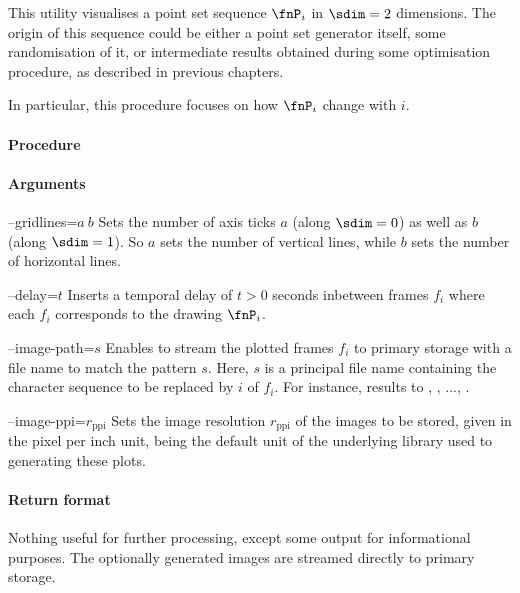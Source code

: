 %
This utility visualises a point set sequence $\fnP_i$ in $\sdim=2$ dimensions. The origin of this sequence could be either a point set generator itself, some randomisation of it, or intermediate results obtained during some optimisation procedure, as described in previous chapters.

In particular, this procedure focuses on how $\fnP_i$ change with $i$.

\paragraph{Procedure}

\begin{synopsis}
\end{synopsis}

\paragraph{Arguments}

\procarginseq{\ptseqsize}

\begin{procarg}{--gridlines=$a\ b$}
  Sets the number of axis ticks $a$ (along $\sdim=0$) as well as $b$ (along $\sdim=1$). So $a$ sets the number of vertical lines, while $b$ sets the number of horizontal lines.
\end{procarg}

\begin{procarg}{--delay=$t$}
  Inserts a temporal delay of $t > 0$ seconds inbetween frames $f_i$ where each $f_i$ corresponds to the drawing $\fnP_i$.
\end{procarg}

\begin{procarg}{--image-path=$s$}
  Enables to stream the plotted frames $f_i$ to primary storage with a file name to match the pattern $s$. Here, $s$ is a principal file name containing the character sequence  to be replaced by $i$ of $f_i$. For instance,  results to , , ..., .
\end{procarg}

\begin{procarg}{--image-ppi=$r_{\text{ppi}}$}
  Sets the image resolution $r_{\text{ppi}}$ of the images to be stored, given in the pixel per inch unit, being the default unit of the underlying library used to generating these plots.
\end{procarg}

\procargsilent


\paragraph{Return format}

Nothing useful for further processing, except some output for informational purposes. The optionally generated images are streamed directly to primary storage.

